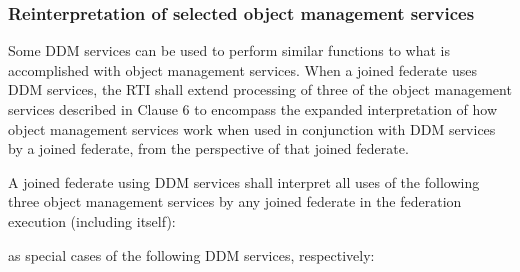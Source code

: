 \begin{compactstdpage}
    \subsubsection{Reinterpretation of selected object management services}

    Some DDM services can be used to perform similar functions to what is accomplished with object management services. When a joined federate uses DDM services, the RTI shall extend processing of three of the object management services described in Clause 6 to encompass the expanded interpretation of how object management services work when used in conjunction with DDM services by a joined federate, from the perspective of that joined federate.

    A joined federate using DDM services shall interpret all uses of the following three object management services by any joined federate in the federation execution (including itself):

    as special cases of the following DDM services, respectively:


\end{compactstdpage}

\clearpage

